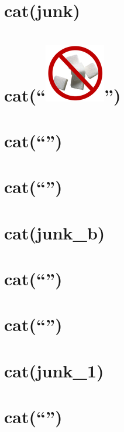 \documentclass[]{article}
\begin{document}
\section{cat(junk)}\label{catjunk}

\section{\texorpdfstring{cat(``\protect\includegraphics{sugar.png}'')}{cat()}}\label{cat-29}

\section{\texorpdfstring{cat(``\n'')}{cat()}}\label{cat-30}

\section{\texorpdfstring{cat(``\n'')}{cat()}}\label{cat-31}

\section{cat(junk\_b)}\label{catjunk_b}

\section{\texorpdfstring{cat(``\n'')}{cat()}}\label{cat-32}

\section{\texorpdfstring{cat(``\n'')}{cat()}}\label{cat-33}

\section{cat(junk\_1)}\label{catjunk_1}

\section{\texorpdfstring{cat(``\n'')}{cat()}}\label{cat-34}
\end{document}
